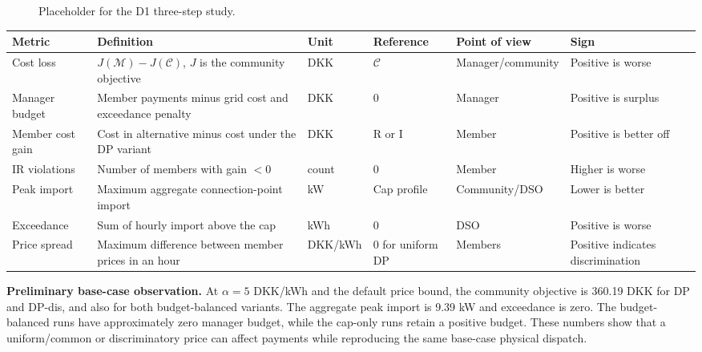\documentclass[]{article}
\begin{document}
\begin{figure}[htbp]
\centering
{}
\caption{Placeholder for the D1 three-step study.}
\label{fig:d1_placeholder}
\end{figure}

\begin{longtable}[]{@{}llllll@{}}
\toprule
Metric & Definition & Unit & Reference & Point of view & Sign \\
\midrule
\endhead
Cost loss & \(J(\mathcal M)-J(\mathcal C)\), \(J\) is the community objective
& DKK & \(\mathcal C\) & Manager/community & Positive is worse \\
Manager budget & Member payments minus grid cost and exceedance penalty
& DKK & 0 & Manager & Positive is surplus \\
Member cost gain & Cost in alternative minus cost under the DP variant
& DKK & R or I & Member & Positive is better off \\
IR violations & Number of members with gain \(<0\) & count & 0 & Member
& Higher is worse \\
Peak import & Maximum aggregate connection-point import & kW & Cap profile
& Community/DSO & Lower is better \\
Exceedance & Sum of hourly import above the cap & kWh & 0 & DSO
& Positive is worse \\
Price spread & Maximum difference between member prices in an hour
& DKK/kWh & 0 for uniform DP & Members & Positive indicates discrimination \\
\bottomrule
\end{longtable}

\textbf{Preliminary base-case observation.}
At \(\alpha=5\) DKK/kWh and the default price bound, the community objective
is 360.19 DKK for DP and DP-dis, and also for both budget-balanced variants.
The aggregate peak import is 9.39 kW and exceedance is zero. The
budget-balanced runs have approximately zero manager budget, while the
cap-only runs retain a positive budget. These numbers show that a
uniform/common or discriminatory price can affect payments while reproducing
the same base-case physical dispatch.
\end{document}

